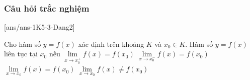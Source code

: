 \subsubsection{Câu hỏi trắc nghiệm}
[ans/ans-1K5-3-Dang2]
\begin{ex}%
	Cho hàm số $y=f(x)$ xác định trên khoảng $K$ và $x_0\in K$. Hàm số $y=f(x)$ liên tục tại $x_0$ nếu
	\choice
	{$\lim \limits_{x\rightarrow x_0^+} f(x) = f(x_0)$}
	{$\lim \limits_{x\rightarrow x_0^-} f(x) = f(x_0)$ }
	{\True $\lim \limits_{x\rightarrow x_0} f(x)= f(x_0)$ }
	{$\lim \limits_{x\rightarrow x_0} f(x) \neq  f(x_0)$ }
\end{ex}

